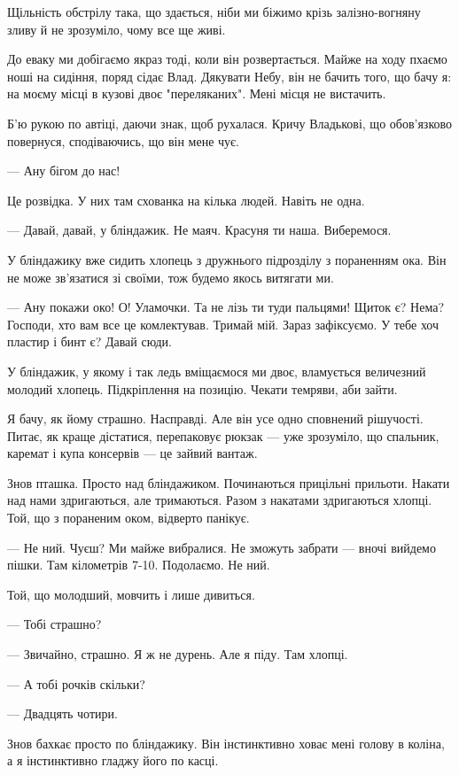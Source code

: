Щільність обстрілу така, що здається, ніби ми біжимо крізь залізно-вогняну
зливу й не зрозуміло, чому все ще живі. 

До еваку ми добігаємо якраз тоді, коли він розвертається. Майже на ходу пхаємо
ноші на сидіння, поряд сідає  Влад. Дякувати Небу, він не бачить того, що бачу
я: на моєму місці в кузові двоє "переляканих". Мені місця не вистачить. 

Б'ю рукою по автіці, даючи знак, щоб рухалася. Кричу Владькові, що обов'язково
повернуся, сподіваючись, що він мене чує. 

— Ану бігом до нас! 

Це розвідка. У них там схованка на кілька людей. Навіть не одна. 

— Давай, давай, у бліндажик. Не маяч. Красуня ти наша. Виберемося. 

У бліндажику вже сидить хлопець з дружнього підрозділу з пораненням ока. Він не
може зв'язатися зі своїми, тож будемо якось витягати ми. 

— Ану покажи око! О! Уламочки. Та не лізь ти туди пальцями!  Щиток є? Нема?
Господи, хто вам все це комлектував.  Тримай мій. Зараз зафіксуємо. У тебе хоч
пластир і бинт є? Давай сюди. 

У бліндажик, у якому і так ледь вміщаємося ми двоє, вламується величезний
молодий хлопець.  Підкріплення на позицію. Чекати темряви, аби зайти. 

Я бачу, як йому страшно. Насправді. Але він усе одно сповнений рішучості.
Питає, як краще дістатися,  перепаковує рюкзак — уже зрозуміло, що спальник,
каремат і купа консервів — це зайвий вантаж. 

Знов пташка.  Просто над бліндажиком. Починаються прицільні прильоти. Накати
над нами здригаються, але тримаються. Разом з накатами здригаються хлопці. Той,
що з пораненим оком, відверто панікує. 

— Не ний. Чуєш? Ми майже вибралися. Не зможуть забрати — вночі вийдемо пішки.
Там кілометрів 7-10. Подолаємо. Не ний. 

Той, що молодший, мовчить і лише дивиться. 

— Тобі страшно?

— Звичайно, страшно. Я ж не дурень. Але я піду. Там хлопці. 

— А тобі рочків скільки?

— Двадцять чотири. 

Знов бахкає просто по бліндажику. Він інстинктивно ховає мені голову в коліна,
а я інстинктивно гладжу його по касці. 

